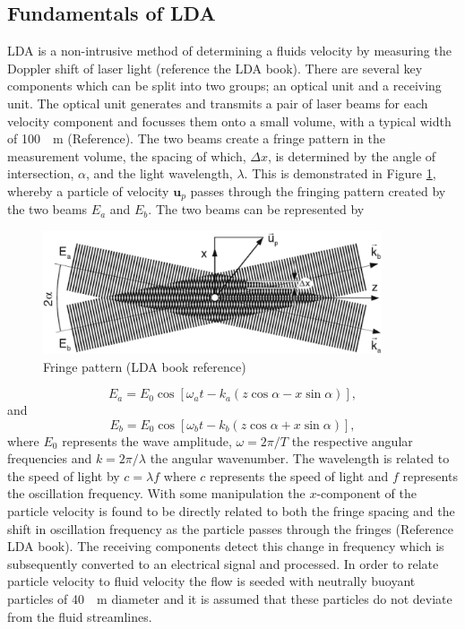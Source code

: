 \documentclass[12pt,oneside,a4paper]{article}
\newcommand{\vect}[1]{\boldsymbol{#1}}
\begin{document}
\subsection{Fundamentals of LDA}
LDA is a non-intrusive method of determining a fluids velocity by measuring the Doppler shift of laser light (reference the LDA book). There are several key components which can be split into two groups; an optical unit and a receiving unit. The optical unit generates and transmits a pair of laser beams for each velocity component and focusses them onto a small volume, with a typical width of \SI{100}{\mu m} (Reference). The two beams create a fringe pattern in the measurement volume, the spacing of which, $\Delta x$, is determined by the angle of intersection, $\alpha$, and the light wavelength, $\lambda$. This is demonstrated in Figure \ref{figure:experiments:fringePattern}, whereby a particle of velocity $\vect{u}_p$ passes through the fringing pattern created by the two beams $E_a$ and $E_b$. The two beams can be represented by 
%
\begin{figure}[!b]
\centering
\includegraphics[width=10cm]{images/LDA_theoryImages/fringePattern.png}
\caption{Fringe pattern (LDA book reference)}
\label{figure:experiments:fringePattern}
\end{figure}
%
\begin{equation}
E_a = E_0 \cos {\left[ \omega_a t - k_a (z \cos{\alpha} - x \sin{\alpha} ) \right]},
\end{equation}
and
\begin{equation}
E_b = E_0 \cos{ \left[ \omega_b t - k_b (z \cos{\alpha} + x \sin{\alpha} ) \right]},
\end{equation}
where $E_0$ represents the wave amplitude, $\omega = 2 \pi / T$ the respective angular frequencies and $k = 2 \pi / \lambda$ the angular wavenumber. The wavelength is related to the speed of light by $c = \lambda f$ where $c$ represents the speed of light and $f$ represents the oscillation frequency. With some manipulation the $x$-component of the particle velocity is found to be directly related to both the fringe spacing and the shift in oscillation frequency as the particle passes through the fringes (Reference LDA book). The receiving components detect this change in frequency which is subsequently converted to an electrical signal and processed. In order to relate particle velocity to fluid velocity the flow is seeded with neutrally buoyant particles of \SI{40}{\mu m} diameter and it is assumed that these particles do not deviate from the fluid streamlines. 
\end{document}
